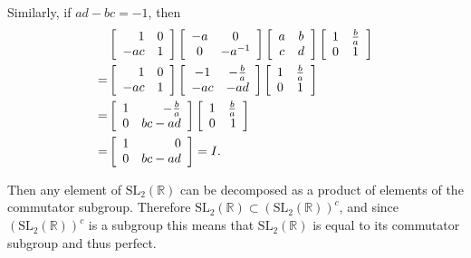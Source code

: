 \documentclass{article}
\begin{document}
\begin{Answer}
\begin{enumerate}[(a)]
{      Similarly, if $ad - bc = -1$, then
      \begin{align*}
       &\left[\begin{array}{r r}
          1   & 0 \\
          -ac & 1
        \end{array}\right]
        \left[\begin{array}{c c}
          -a & 0     \\
           0 & -a^{-1}
        \end{array}\right]
        \left[\begin{array}{c c}
          a & b \\ c & d
        \end{array}\right]
        \left[\begin{array}{c c}
          1 & \frac{b}{a} \\
          0 & 1
        \end{array}\right] \\
      =&
        \left[\begin{array}{r r}
          1   & 0 \\
          -ac & 1
        \end{array}\right]
        \left[\begin{array}{c c}
          -1 & -\frac{b}{a} \\ -ac & -ad
        \end{array}\right]
        \left[\begin{array}{c c}
          1 & \frac{b}{a} \\
          0 & 1
        \end{array}\right] \\
      =&
        \left[\begin{array}{r r}
          1 & -\frac{b}{a} \\ 0 & bc - ad
        \end{array}\right]
        \left[\begin{array}{r r}
          1 & \frac{b}{a} \\ 0 & 1
        \end{array}\right] \\
      =&
        \left[\begin{array}{r r}
          1 & 0 \\ 0 & bc - ad
        \end{array}\right] = I.
      \end{align*}

      Then any element of
      $\mathrm{SL}_2(\mathbb{R})$ can be decomposed as a product of
      elements of the commutator subgroup. Therefore
      $\mathrm{SL}_2(\mathbb{R}) \subset (\mathrm{SL}_2(\mathbb{R}))^c$,
      and since $(\mathrm{SL}_2(\mathbb{R}))^c$ is a subgroup this
      means that $\mathrm{SL}_2(\mathbb{R})$ is equal to its
      commutator subgroup and thus perfect.
      }
\end{enumerate}

\end{Answer}
\end{document}
